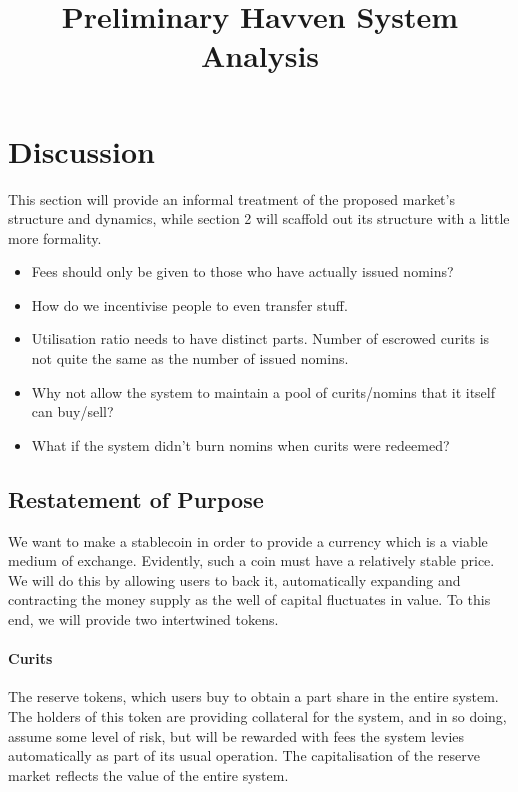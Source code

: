 \documentclass{article}
\begin{document}
\title{Preliminary Havven System Analysis}
\date{}

\begin{figure}
    \centering
    
\end{figure}
\maketitle

\section{Discussion}

This section will provide an informal treatment of the proposed market's structure
and dynamics, while section 2 will scaffold out its structure with a little more
formality.

\begin{itemize}
    \item Fees should only be given to those who have actually issued nomins?
    \item How do we incentivise people to even transfer stuff.
    \item Utilisation ratio needs to have distinct parts. Number of escrowed curits is not quite the same as the number of issued nomins.
    \item Why not allow the system to maintain a pool of curits/nomins that it itself can buy/sell?
    \item What if the system didn't burn nomins when curits were redeemed?
\end{itemize}

\subsection{Restatement of Purpose}
We want to make a stablecoin in order to provide a currency which is a viable medium of exchange.
Evidently, such a coin must have a relatively stable price. We will do this by allowing users to back it,
automatically expanding and contracting the money supply as the well of capital fluctuates in value.
To this end, we will provide two intertwined tokens.
\paragraph{Curits} The reserve tokens, which users buy to obtain a part share in the entire system. The holders
of this token are providing collateral for the system, and in so doing, assume some level of risk, but will
be rewarded with fees the system levies automatically as part of its usual operation. The capitalisation
of the reserve market reflects the value of the entire system.
\end{document}
